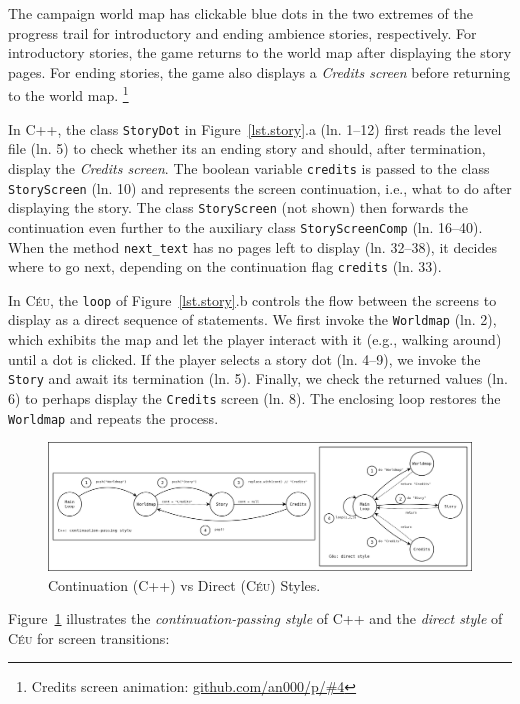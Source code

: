 \documentclass{vgtc}                          %
\newcommand{\CEU}{\textsc{C\'{e}u}\xspace}
\newcommand{\code}[1] {{\small{\texttt{#1}}}}
\begin{document}
The campaign world map has clickable blue dots in the two extremes of the
progress trail for introductory and ending ambience stories, respectively.
For introductory stories, the game returns to the world map after displaying 
the story pages.
For ending stories, the game also displays a \emph{Credits screen} before
returning to the world map.%
\footnote{Credits screen animation: \url{github.com/an000/p/#4} }

In C++, the class \code{StoryDot} in Figure~\ref{lst.story}.a (ln. 1--12) first
reads the level file (ln. 5) to check whether its an ending story and should,
after termination, display the \emph{Credits screen}.
%
The boolean variable \code{credits} is passed to the class
\code{StoryScreen} (ln. 10) and represents the screen continuation, i.e., what
to do after displaying the story.
The class \code{StoryScreen} (not shown) then forwards the continuation even
further to the auxiliary class \code{StoryScreenComp} (ln. 16--40).
%
When the method \code{next\_text} has no pages left to display (ln. 32--38),
it decides where to go next, depending on the continuation flag
\code{credits} (ln. 33).

In \CEU, the \code{loop} of Figure~\ref{lst.story}.b controls the flow between
the screens to display as a direct sequence of statements.
%
We first invoke the \code{Worldmap} (ln. 2), which exhibits the map and let
the player interact with it (e.g., walking around) until a dot is clicked.
If the player selects a story dot (ln. 4--9), we invoke the \code{Story}
and await its termination (ln. 5).
Finally, we check the returned values (ln. 6) to perhaps display the
\code{Credits} screen (ln. 8).
The enclosing loop restores the \code{Worldmap} and repeats the process.

\begin{figure}[t]
\centering
\includegraphics[width=\textwidth]{continuation}
\caption{ Continuation (C++) vs Direct (\CEU) Styles.
\label{fig.story}
}
\end{figure}

Figure~\ref{fig.story} illustrates the \emph{continuation-passing style} of
C++ and the \emph{direct style} of \CEU for screen transitions:
\end{document}
